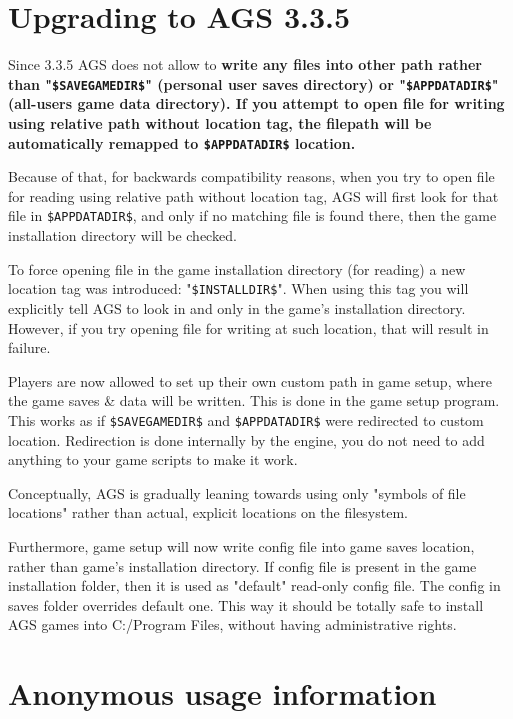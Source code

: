 \chapter{Upgrading to AGS 3.3.5}\label{UpgradeTo335}%

Since 3.3.5 AGS does not allow to \bf{write} any files into other path rather than "\verb^$SAVEGAMEDIR$^"
(personal user saves directory) or "\verb^$APPDATADIR$^" (all-users game data directory). If you attempt to open
file for \bf{writing} using relative path without location tag, the filepath will be automatically remapped to
\verb^$APPDATADIR$^ location.

Because of that, for backwards compatibility reasons, when you try to open file for reading using relative path
without location tag, AGS will first look for that file in \verb^$APPDATADIR$^, and only if no matching file is
found there, then the game installation directory will be checked.

To force opening file in the game installation directory (for reading) a new location tag was introduced: 
"\verb^$INSTALLDIR$^". When using this tag you will explicitly tell AGS to look in and only in the game's
installation directory. However, if you try opening file for writing at such location, that will result in
failure.

Players are now allowed to set up their own custom path in game setup, where the game
saves & data will be written. This is done in the game setup program.
This works as if \verb^$SAVEGAMEDIR$^ and \verb^$APPDATADIR$^ were redirected to custom location.
Redirection is done internally by the engine, you do not need to add anything to your game scripts to make it work.

Conceptually, AGS is gradually leaning towards using only "symbols of file locations" rather than actual,
explicit locations on the filesystem.

Furthermore, game setup will now write config file into game saves location, rather than game's installation directory.
If config file is present in the game installation folder, then it is used as "default" read-only config file.
The config in saves folder overrides default one.
This way it should be totally safe to install AGS games into C:/Program Files, without having administrative rights.


\chapter{Anonymous usage information}\label{AnonymousUsageInfo}%

